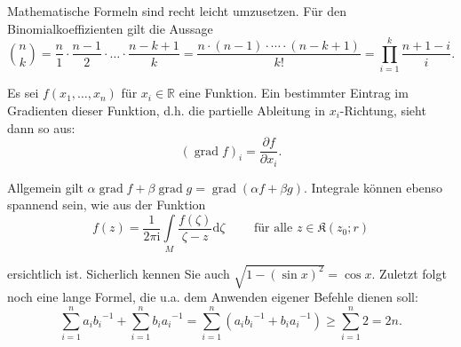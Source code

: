 \documentclass[12pt,a4paper]{scrartcl}
\DeclareMathOperator{\grad}{grad}
\newcommand{\Sum}{\sum\limits_{i=1}^{n}}
\newcommand{\abMinus}{{a_{i}b_{i}}^{-1}}
\newcommand{\baMinus}{{b_{i}a_{i}}^{-1}}
\newcommand{\fivedots}{\cdot \cdots \cdot}
\begin{document}
\thispagestyle{empty}

Mathematische Formeln sind recht leicht umzusetzen. Für den Binomialkoeffizienten
gilt die Aussage
\[
  \binom{n}{k}
  = \frac{n}{1} \cdot \frac{n-1}{2} \cdot \ldots \cdot \frac{n-k+1}{k}
  = \frac{n \cdot (n-1) \fivedots (n-k+1)}{k!}
  = \prod_{i=1}^{k} \frac{n+1-i}{i}.
\]

\noindent
Es sei $f(x_{1}, \ldots, x_{n})$ für $x_{i} \in \mathbb{R}$ eine Funktion. Ein bestimmter
Eintrag im Gradienten dieser Funktion, d.h. die partielle Ableitung in $x_{i}$-Richtung,
sieht dann so aus:
\[
 (\grad f)_{i}
 = \frac{\partial f}{\partial x_{i}}.
\]

\noindent
Allgemein gilt $\alpha \grad f + \beta \grad g = \grad(\alpha f + \beta g)$. Integrale
können ebenso spannend sein, wie aus der Funktion
\[
 f(z)
 = \frac{1}{2 \pi \mathrm{i}}
   \int\limits_{M} \frac{f(\zeta)}{\zeta-z} \mathrm{d}\zeta
   \qquad \text{ für alle } z \in \mathfrak{K}(z_{0};r)
\]

\noindent
ersichtlich ist. Sicherlich kennen Sie auch $\sqrt{1-(\sin x)^2} = \cos x$. Zuletzt folgt noch
eine lange Formel, die u.a. dem Anwenden eigener Befehle dienen soll:
\[
  \Sum\abMinus + \Sum\baMinus
  = \Sum(\abMinus + \baMinus)
  \geq \Sum 2 =2n.
\]
\end{document}
